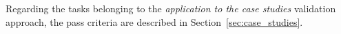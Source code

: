 Regarding the tasks belonging to the \emph{application to the case studies} validation approach, the pass criteria are described in Section~\ref{sec:case_studies}.


%
%
%
%
%

\clearpage
